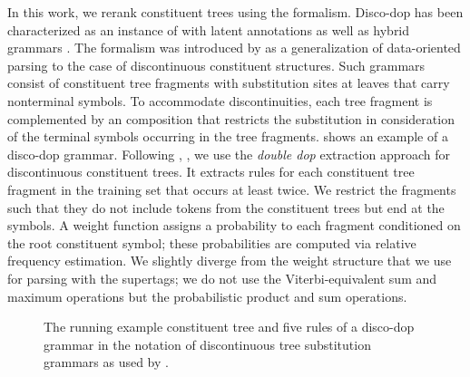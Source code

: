 \documentclass[../../document.tex]{subfiles}
\begin{document}
    In this work, we rerank constituent trees using the   formalism.
    Disco-dop has been characterized as an instance of  with latent annotations \citep[Section~4]{Cra11} as well as hybrid grammars \citep[Section~8.5.1]{Geb20}.
    The formalism was introduced by \citet{Cra11} as a generalization of data-oriented parsing \citep{Bod92} to the case of discontinuous constituent structures.
    Such grammars consist of constituent tree fragments with substitution sites at leaves that carry nonterminal symbols.
    To accommodate discontinuities, each tree fragment is complemented by an  composition that restricts the substitution in consideration of the terminal symbols occurring in the tree fragments.
     shows an example of a disco-dop grammar.
    Following \citet{San11}, \citet{Cra11}, we use the \emph{double dop} extraction approach for discontinuous constituent trees.
    It extracts rules for each constituent tree fragment in the training set that occurs at least twice.
    We restrict the fragments such that they do not include tokens from the constituent trees but end at the  symbols.
    A weight function assigns a probability to each fragment conditioned on the root constituent symbol; these probabilities are computed via relative frequency estimation.
    We slightly diverge from the weight structure that we use for parsing with the supertags; we do not use the Viterbi-equivalent sum and maximum operations but the probabilistic product and sum operations.
    
    \begin{figure}
        \null\hfill
        
        \hspace{1cm}
        
        \hfill\null
        \caption{\label{fig:ex:dop}
            The running example constituent tree and five rules of a disco-dop grammar in the notation of discontinuous tree substitution grammars as used by \citet{CraSchBod16}.}
    \end{figure}
\end{document}
